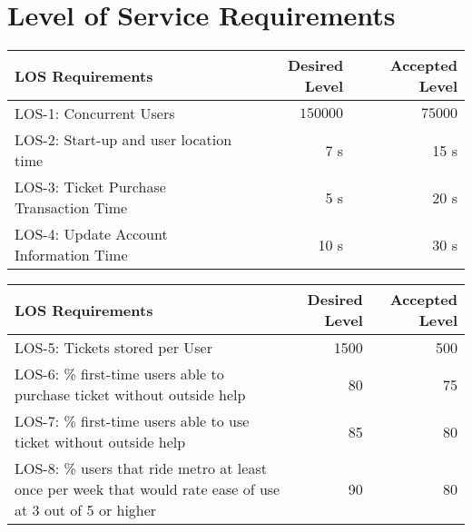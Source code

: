 \section{Level of Service Requirements}
\begin{frame}
\begin{table}[h]
    \begin{tabularx}{\textwidth}{Xrr}
    \hline
    LOS Requirements                                                                                          									& Desired Level & Accepted Level \\ \hline
    LOS-1: Concurrent Users														& $150000$		& $75000$           \\
    LOS-2: Start-up and user location time 										& 7 s  			& 15 s           \\
    LOS-3: Ticket Purchase Transaction Time										& 5 s 			& 20 s            \\
    LOS-4: Update Account Information Time										& 10 s 			& 30 s            \\
    \hline
    \end{tabularx}
\end{table}
\end{frame}    
\begin{frame}
\begin{table}[h]
    \begin{tabularx}{\textwidth}{Xrr}
    \hline
    LOS Requirements                                                                                          									& Desired Level & Accepted Level \\ \hline
    LOS-5: Tickets stored per User												& 1500 			& 500            \\
    LOS-6: \% first-time users able to purchase ticket without outside help		& 80  			& 75             \\ 
    LOS-7: \% first-time users able to use ticket without outside help			& 85 			& 80             \\
    LOS-8: \% users that ride metro at least once per week that would rate 
    ease of use at 3 out of 5 or higher											& 90  			& 80             \\
    \hline
    \end{tabularx}
\end{table}
\end{frame}    
